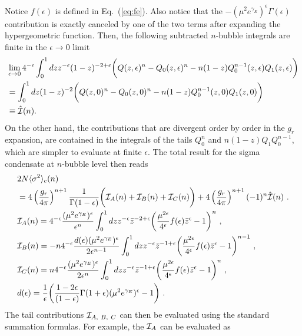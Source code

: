 \documentclass[a4paper,11pt]{article}
\begin{document}
Notice $f(\epsilon)$ is defined in Eq.~(\ref{eq:fe}). Also notice that the $-(\mu^2e^{\gamma_E})^{\epsilon}\Gamma(\epsilon)$ contribution is exactly canceled by one of the two terms after expanding the hypergeometric function. Then, the following subtracted $n$-bubble integrals are finite in the $\epsilon \rightarrow 0$ limit
\begin{align}
&\lim_{\epsilon\rightarrow 0}4^{-\epsilon}\int_0^1 dz z^{-\epsilon}(1-z)^{-2+\epsilon} \bigg(Q(z,\epsilon)^n-Q_0(z,\epsilon)^n-n(1-z)Q_0^{n-1}(z,\epsilon)Q_1(z,\epsilon)\bigg) \nonumber \\ 
&=\int_0^1 dz (1-z)^{-2} \bigg(Q(z,0)^n-Q_0(z,0)^n-n(1-z)Q_0^{n-1}(z,0)Q_1(z,0)\bigg) \ \nonumber \\ 
& \equiv \hat {\cal I}(n).
\end{align}
On the other hand, the contributions that are divergent order by order in the $g_r$ expansion, are contained in the integrals of the tails $Q_0^n$ and $n(1-z)Q_1Q_0^{n-1}$, which are simpler to evaluate at finite $\epsilon$. The total result for the sigma condensate at $n$-bubble level then reads
\begin{align}
& 2N\langle \sigma^2\rangle_c(n)\nonumber \\ 
&=4\left(\frac{g_r}{4\pi}\right)^{n+1}\frac{1}{\Gamma(1-\epsilon)} \bigg({\cal I}_A(n)+{\cal I}_B(n)+{\cal I}_C(n)\bigg)+4\left(\frac{g_r}{4\pi}\right)^{n+1}(-1)^n\hat {\cal I}(n) \ .\\ 
&{\cal I}_A(n)=4^{-\epsilon}  \frac{(\mu^2e^{\gamma_E})^{\epsilon}}{\epsilon^n}\int_0^1 dz z^{-\epsilon}\bar z^{-2+\epsilon}\bigg(\frac{\mu^{2\epsilon}}{4^{\epsilon}}f(\epsilon)\bar z^{\epsilon}-1\bigg)^n \ , \\
&{\cal I}_B(n)=-n4^{-\epsilon} \frac{d(\epsilon)(\mu^2e^{\gamma_E})^{\epsilon}}{2\epsilon^{n-1}}\int_0^1 dz z^{-\epsilon}\bar z^{-1+\epsilon}\bigg(\frac{\mu^{2\epsilon}}{4^{\epsilon}}f(\epsilon)\bar z^{\epsilon}-1\bigg)^{n-1} \ , \\
&{\cal I}_C(n)=n4^{-\epsilon} \frac{(\mu^2e^{\gamma_E})^{\epsilon}}{2\epsilon^n}\int_0^1 dz  z^{-\epsilon}\bar z^{-1+\epsilon}\bigg(\frac{\mu^{2\epsilon}}{4^{\epsilon}}f(\epsilon)\bar z^{\epsilon}-1\bigg)^{n} \ , \\
& d(\epsilon)=\frac{1}{\epsilon}\bigg(\frac{1-2\epsilon}{(1-\epsilon)}\Gamma(1+\epsilon)(\mu^2e^{\gamma_E})^{\epsilon}-1\bigg)\ .
\end{align}
The tail contributions ${\cal I}_{A, \ B, \ C}$ can then be evaluated using the standard summation formulas. For example, the ${\cal I}_A$ can be evaluated as
\end{document}
